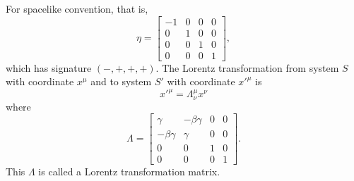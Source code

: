 \documentclass[a4paper,12pt]{article}
\begin{document}
For spacelike convention, that is,
\[\eta=\begin{bmatrix}-1&0&0&0\\0&1&0&0\\0&0&1&0\\0&0&0&1\end{bmatrix},\]
which has signature $(-,+,+,+)$.
The Lorentz transformation from system $S$ with coordinate $x^{\mu}$ and to system $S'$ with coordinate $x'^{\mu}$ is
\[x'^{\mu}=\Lambda^{\mu}_{\nu}x^{\nu}\]
where
\[\Lambda=\begin{bmatrix}\gamma&-\beta\gamma&0&0\\-\beta\gamma&\gamma&0&0\\0&0&1&0\\0&0&0&1\end{bmatrix}.\]
This $\Lambda$ is called a Lorentz transformation matrix.
\end{document}
